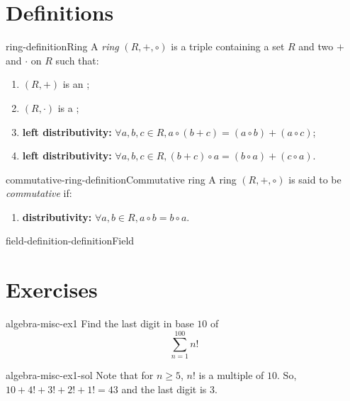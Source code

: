 \documentclass[preview]{standalone}
\begin{document}
\genpage

\section{Definitions}

\begin{snippetdefinition}{ring-definition}{Ring}
    A \textit{ring} \((R, +, \circ)\) is a triple containing a set \(R\) and two 
    \(+\) and \(\cdot\) on \(R\) such that:
    \begin{enumerate}
        \item \((R, +)\) is an \abeliangroup;
        \item \((R, \cdot)\) is a \monoid;
        \item \textbf{left distributivity:} \(\forall a,b,c\in R, a\circ(b+c) = (a\circ b) + (a \circ c)\);
        \item \textbf{left distributivity:} \(\forall a,b,c\in R, (b+c)\circ a = (b\circ a) + (c \circ a)\).
    \end{enumerate}
\end{snippetdefinition}

\begin{snippetdefinition}{commutative-ring-definition}{Commutative ring}
    A ring \((R, +, \circ)\) is said to be \textit{commutative} if:
    \begin{enumerate}
        \item \textbf{distributivity:} \(\forall a,b\in R, a\circ b = b\circ a\).
    \end{enumerate}
\end{snippetdefinition}

\begin{snippetdefinition}{field-definition-definition}{Field}
    \todo
\end{snippetdefinition}

\section{Exercises}

\begin{snippetexercise}{algebra-misc-ex1}{}
    Find the last digit in base \(10\) of
    \[
        \sum_{n=1}^{100} n!
    \]
\end{snippetexercise}

\begin{snippetsolution}{algebra-misc-ex1-sol}{}
    Note that for \(n\geq 5\), \(n!\) is a multiple of \(10\).
    So, \(10 + 4! + 3! + 2! + 1! = 43\) and the last digit is \(3\).
\end{snippetsolution}
\end{document}
